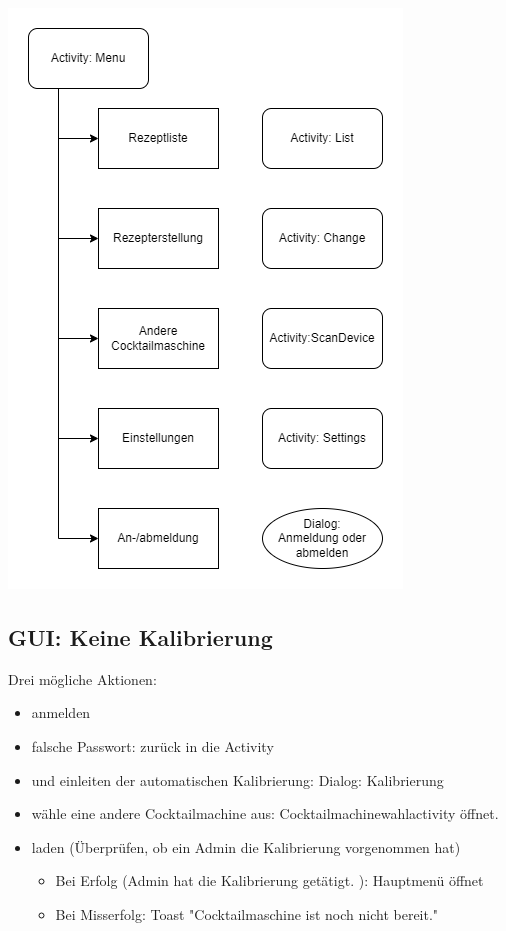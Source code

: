 \includegraphics[scale=0.65]{Menu.png}

\subsection{GUI: Keine Kalibrierung}

Drei mögliche Aktionen:

\begin{itemize}
\item anmelden
\item falsche Passwort: zurück in die Activity
\item und einleiten der automatischen Kalibrierung: Dialog: Kalibrierung
\item wähle eine andere Cocktailmachine aus: Cocktailmachinewahlactivity öffnet.
\item laden (Überprüfen, ob ein Admin die Kalibrierung vorgenommen hat)
\begin{itemize}

	\item Bei Erfolg (Admin hat die Kalibrierung getätigt. ): Hauptmenü öffnet
	
	\item Bei Misserfolg: Toast "Cocktailmaschine ist noch nicht bereit."

\end{itemize}
\end{itemize}


